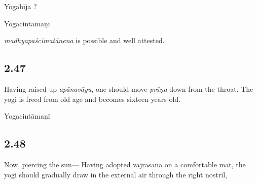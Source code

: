 \begin{ekdosis}
\begin{sources}[hp02_046]
Yogabīja ?
\end{sources}

\begin{testimonia}[hp02_046]
Yogacintāmaṇī

\begin{versinnote}
\end{versinnote}
\end{testimonia}

\begin{philcomm}[hp02_046]
\emph{madhyapaścimatānena} is possible and well attested.
\end{philcomm}

\subsection*{2.47}
\begin{translation}[hp02_047]
Having raised up \emph{apānavāyu}, one should move \emph{prāṇa} down from the throat. The yogi is freed from old age and becomes sixteen years old.
\end{translation}

\begin{sources}[hp02_047]
\end{sources}

\begin{testimonia}[hp02_047]
Yogacintāmaṇī 

\begin{versinnote}
\end{versinnote}
\end{testimonia}

\begin{philcomm}[hp02_047]
\end{philcomm}

\subsection*{2.48}
\begin{translation}[hp02_048]
Now, piercing the sun---
Having adopted vajrāsana on a comfortable mat, the yogi should gradually draw in the external air through the right nostril,
\end{translation}


\end{ekdosis}
